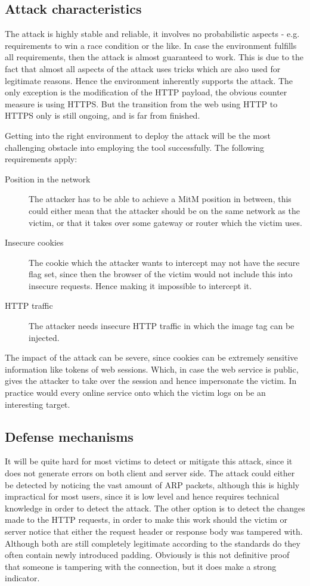 \subsection{Attack characteristics}
The attack is highly stable and reliable, it involves no probabilistic aspects - e.g. requirements to win a race condition or the like. In case the environment fulfills all requirements, then the attack is almost guaranteed to work. This is due to the fact that almost all aspects of the attack uses tricks which are also used for legitimate reasons. Hence the environment inherently supports the attack. The only exception is the modification of the HTTP payload, the obvious counter measure is using HTTPS. But the transition from the web using HTTP to HTTPS only is still ongoing, and is far from finished.

Getting into the right environment to deploy the attack will be the most challenging obstacle into employing the tool successfully. The following requirements apply:
\begin{description}
	\item[Position in the network] The attacker has to be able to achieve a MitM position in between, this could either mean that the attacker should be on the same network as the victim, or that it takes over some gateway or router which the victim uses.
	\item[Insecure cookies] The cookie which the attacker wants to intercept may not have the secure flag set, since then the browser of the victim would not include this into insecure requests. Hence making it impossible to intercept it.
	\item[HTTP traffic] The attacker needs insecure HTTP traffic in which the image tag can be injected.
\end{description}

\noindent The impact of the attack can be severe, since cookies can be extremely sensitive information like tokens of web sessions. Which, in case the web service is public, gives the attacker to take over the session and hence impersonate the victim. In practice would every online service onto which the victim logs on be an interesting target.

\subsection{Defense mechanisms}
It will be quite hard for most victims to detect or mitigate this attack, since it does not generate errors on both client and server side. The attack could either be detected by noticing the vast amount of ARP packets, although this is highly impractical for most users, since it is low level and hence requires technical knowledge in order to detect the attack. The other option is to detect the changes made to the HTTP requests, in order to make this work should the victim or server notice that either the request header or response body was tampered with. Although both are still completely legitimate according to the standards do they often contain newly introduced padding. Obviously is this not definitive proof that someone is tampering with the connection, but it does make a strong indicator.